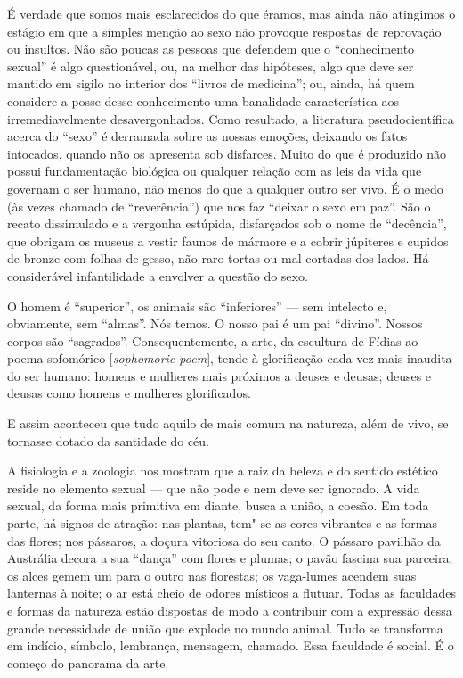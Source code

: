 É verdade que somos mais esclarecidos do que éramos, mas ainda não
atingimos o estágio em que a simples menção ao sexo não provoque
respostas de reprovação ou insultos. Não são poucas as pessoas que
defendem que o ``conhecimento sexual'' é algo questionável, ou, na
melhor das hipóteses, algo que deve ser mantido em sigilo no interior
dos ``livros de medicina''; ou, ainda, há quem considere a posse desse
conhecimento uma banalidade característica aos irremediavelmente
desavergonhados. Como resultado, a literatura pseudocientífica acerca do
``sexo'' é derramada sobre as nossas emoções, deixando os fatos
intocados, quando não os apresenta sob disfarces. Muito do que é
produzido não possui fundamentação biológica ou qualquer relação com as
leis da vida que governam o ser humano, não menos do que a qualquer outro ser
vivo. É o medo (às vezes chamado de ``reverência'') que nos faz ``deixar
o sexo em paz''. São o recato dissimulado e a vergonha estúpida,
disfarçados sob o nome de ``decência'', que obrigam os museus a vestir
faunos de mármore e a cobrir júpiteres e cupidos de bronze com folhas de
gesso, não raro tortas ou mal cortadas dos lados. Há considerável
infantilidade a envolver a questão do sexo.

O homem é ``superior'', os animais são ``inferiores'' --- sem intelecto
e, obviamente, sem ``almas''. Nós temos. O nosso pai é um pai
``divino''. Nossos corpos são ``sagrados''. Consequentemente, a arte, da
escultura de Fídias ao poema sofomórico {[}\emph{sophomoric poem}{]},
tende à glorificação cada vez mais inaudita do ser humano: homens e mulheres
mais próximos a deuses e deusas; deuses e deusas como homens e mulheres
glorificados.

E assim aconteceu que tudo aquilo de mais comum na natureza, além de
vivo, se tornasse dotado da santidade do céu.


A fisiologia e a zoologia nos mostram que a raiz da beleza e do sentido
estético reside no elemento sexual --- que não pode e nem deve ser
ignorado. A vida sexual, da forma mais primitiva em diante, busca a
união, a coesão. Em toda parte, há signos de atração: nas plantas,
tem"-se as cores vibrantes e as formas das flores; nos pássaros, a doçura
vitoriosa do seu canto. O pássaro pavilhão da Austrália decora a sua
``dança'' com flores e plumas; o pavão fascina sua parceira; os alces
gemem um para o outro nas florestas; os vaga-lumes acendem suas lanternas
à noite; o ar está cheio de odores místicos a flutuar. Todas as
faculdades e formas da natureza estão dispostas de modo a contribuir com
a expressão dessa grande necessidade de união que explode no mundo
animal. Tudo se transforma em indício, símbolo, lembrança, mensagem,
chamado. Essa faculdade é social. É o começo do panorama da arte.

